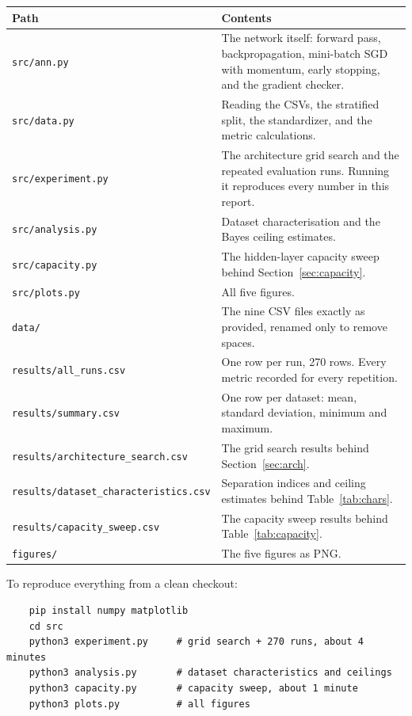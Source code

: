\documentclass[11pt]{article}
\begin{document}
\begin{table}[H]
\centering
\small
\begin{tabular}{p{4.6cm}p{9.9cm}}
\toprule
\textbf{Path} & \textbf{Contents} \\
\midrule
\texttt{src/ann.py} &
The network itself: forward pass, backpropagation, mini-batch SGD with
momentum, early stopping, and the gradient checker. \\
\texttt{src/data.py} &
Reading the CSVs, the stratified split, the standardizer, and the metric
calculations. \\
\texttt{src/experiment.py} &
The architecture grid search and the repeated evaluation runs. Running it
reproduces every number in this report. \\
\texttt{src/analysis.py} &
Dataset characterisation and the Bayes ceiling estimates. \\
\texttt{src/capacity.py} &
The hidden-layer capacity sweep behind Section~\ref{sec:capacity}. \\
\texttt{src/plots.py} &
All five figures. \\
\texttt{data/} &
The nine CSV files exactly as provided, renamed only to remove spaces. \\
\texttt{results/all\_runs.csv} &
One row per run, 270 rows. Every metric recorded for every repetition. \\
\texttt{results/summary.csv} &
One row per dataset: mean, standard deviation, minimum and maximum. \\
\texttt{results/architecture\_search.csv} &
The grid search results behind Section~\ref{sec:arch}. \\
\texttt{results/dataset\_characteristics.csv} &
Separation indices and ceiling estimates behind Table~\ref{tab:chars}. \\
\texttt{results/capacity\_sweep.csv} &
The capacity sweep results behind Table~\ref{tab:capacity}. \\
\texttt{figures/} &
The five figures as PNG. \\
\bottomrule
\end{tabular}
\end{table}

To reproduce everything from a clean checkout:
\begin{verbatim}
    pip install numpy matplotlib
    cd src
    python3 experiment.py     # grid search + 270 runs, about 4 minutes
    python3 analysis.py       # dataset characteristics and ceilings
    python3 capacity.py       # capacity sweep, about 1 minute
    python3 plots.py          # all figures
\end{verbatim}
\end{document}
